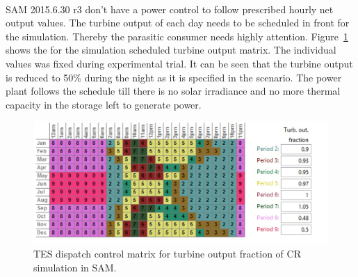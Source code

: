 \documentclass[Master,MEE,english]{twbook}%
\begin{document}
\\
SAM 2015.6.30 r3 don't have a power control to follow prescribed hourly net output values. The turbine output of each day needs to be scheduled in front for the simulation. Thereby the parasitic consumer needs highly attention. Figure~\ref{CR_turbineoutput} shows the for the simulation scheduled turbine output matrix. The individual values was fixed during experimental trial. It can be seen that the turbine output is reduced to 50\% during the night as it is specified in the scenario. The power plant follows the schedule till there is no solar irradiance and no more thermal capacity in the storage left to generate power. 
\begin{figure}[htbp]  
\centering
\includegraphics[width=0.95\linewidth]{FIG/CR_turbineoutput}
\caption[TES dispatch control matrix for turbine output fraction of CR simulation in SAM.]{TES dispatch control matrix for turbine output fraction of CR simulation in SAM.}\label{CR_turbineoutput}
\end{figure}
\pagebreak
\end{document}
